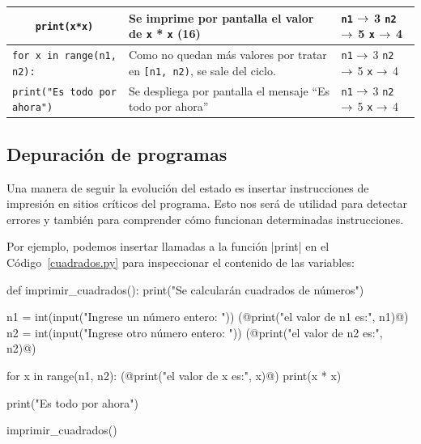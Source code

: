 \begin{longtable}[c]{p{5.5cm} p{5.5cm} p{1.5cm}}
\hline
\lstinline+    print(x*x)+
&
Se imprime por pantalla el valor de \lstinline!x! * \lstinline!x! (16)
&
\lstinline!n1! $\rightarrow$ 3 \newline
\lstinline!n2! $\rightarrow$ 5 \newline
\lstinline!x! $\rightarrow$ 4 \\

\hline
\lstinline+for x in range(n1, n2):+
&
Como no quedan más valores por tratar en \lstinline![n1, n2)!,
se sale del ciclo.
&
\lstinline!n1! $\rightarrow$ 3 \newline
\lstinline!n2! $\rightarrow$ 5 \newline
\lstinline!x! $\rightarrow$ 4 \\

\hline
\lstinline+print("Es todo por ahora")+
&
Se despliega por pantalla el mensaje \enquote{Es todo por ahora}
&
\lstinline!n1! $\rightarrow$ 3 \newline
\lstinline!n2! $\rightarrow$ 5 \newline
\lstinline!x! $\rightarrow$ 4 \\

\end{longtable}

\subsection{Depuración de programas}

Una manera de seguir la evolución del estado es insertar instrucciones de impresión
en sitios críticos del programa. Esto nos será de utilidad para detectar errores
y también para comprender cómo funcionan determinadas instrucciones.

Por ejemplo, podemos insertar llamadas a la función |print| en el
Código~\ref{cuadrados.py} para inspeccionar el contenido de las variables:

\begin{codigo-python-sn}
def imprimir_cuadrados():
    print("Se calcularán cuadrados de números")

    n1 = int(input("Ingrese un número entero: "))
    (@print("el valor de n1 es:", n1)@)
    n2 = int(input("Ingrese otro número entero: "))
    (@print("el valor de n2 es:", n2)@)

    for x in range(n1, n2):
        (@print("el valor de x es:", x)@)
        print(x * x)

    print("Es todo por ahora")

imprimir_cuadrados()
\end{codigo-python-sn}

